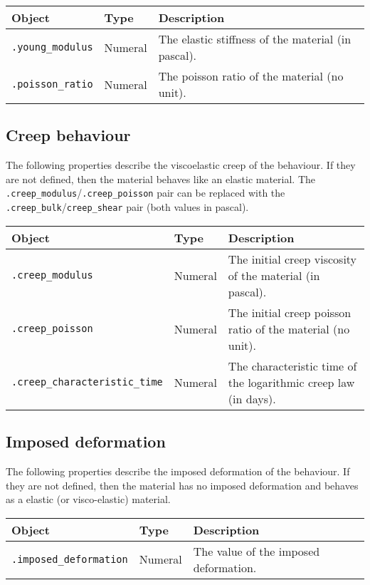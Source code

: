 \documentclass[10pt]{article}
\begin{document}
\begin{tabularx}{\textwidth}{llX}
\hline 
Object & Type & Description \\ 
\hline 
\verb+.young_modulus+ & Numeral & The elastic stiffness of the material (in pascal).\\
\verb+.poisson_ratio+ & Numeral & The poisson ratio of the material (no unit).\\
\hline 
\end{tabularx}

\subsection{Creep behaviour}

The following properties describe the viscoelastic creep of the behaviour. If they are not defined, then the material behaves like an elastic material. The \verb+.creep_modulus+/\verb+.creep_poisson+ pair can be replaced with the \verb+.creep_bulk+/\verb+creep_shear+ pair (both values in pascal).\\

\begin{tabularx}{\textwidth}{llX}
\hline 
Object & Type & Description \\ 
\hline 
\verb+.creep_modulus+ & Numeral & The initial creep viscosity of the material (in pascal).\\
\verb+.creep_poisson+ & Numeral & The initial creep poisson ratio of the material (no unit).\\
\verb+.creep_characteristic_time+ & Numeral & The characteristic time of the logarithmic creep law (in days).\\
\hline 
\end{tabularx}

\subsection{Imposed deformation}

The following properties describe the imposed deformation of the behaviour. If they are not defined, then the material has no imposed deformation and behaves as a elastic (or visco-elastic) material.\\

\begin{tabularx}{\textwidth}{llX}
\hline 
Object & Type & Description \\ 
\hline 
\verb+.imposed_deformation+ & Numeral & The value of the imposed deformation.\\
\hline 
\end{tabularx}
\end{document}
